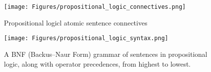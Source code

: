 %			 
%
%			 
%			 
%			 
%			 
%			 
%			 

\begin{figure}[H]
    \centering
    \texttt{[image: Figures/propositional\_logic\_connectives.png]}
    \caption{Propositional logicl atomic sentence connectives}
    \label{fig:connectives}
\end{figure}


\begin{figure}[H]
    \centering
    \texttt{[image: Figures/propositional\_logic\_syntax.png]}
    \caption{A BNF (Backus–Naur Form) grammar of sentences in propositional logic,
along with operator precedences, from highest to lowest.}
    \label{fig:connectives}
\end{figure}












